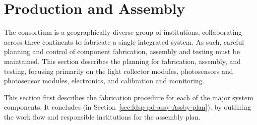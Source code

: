 \section{Production and Assembly}
\label{sec:fdsp-pd-prod-assy}
The \single {} consortium is a geographically diverse group of institutions, collaborating across three continents to fabricate a single integrated system.  As such, careful planning and control of component fabrication, assembly and testing must be maintained.
This section describes the planning for fabrication, assembly, and testing, focusing primarily on the  light collector modules, photosensors and photosensor modules, electronics, and calibration and monitoring.

 
This section first describes the fabrication procedure for each of the major  system components.  It concludes (in Section~\ref{sec:fdsp-pd-assy-Assby-plan}), by outlining the work flow and responsible institutions for the assembly plan.





